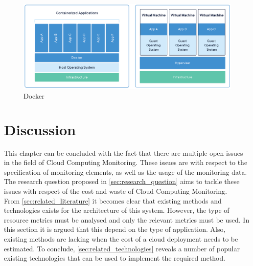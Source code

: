 \begin{figure}
    \centering
    \includegraphics[width=\textwidth]{gfx/docker.png}
    \caption[Docker]{Docker\footnotemark}
    \label{fig:docker}
\end{figure}


\section{Discussion} \label{sec:relatedwork_discussion}

This chapter can be concluded with the fact that there are multiple open issues in the field of Cloud Computing Monitoring. These issues are with respect to the specification of monitoring elements, as well as the usage of the monitoring data. The research question proposed in \autoref{sec:research_question}
aims to tackle these issues with respect of the cost and waste of Cloud Computing Monitoring.\\

\noindent
From \autoref{sec:related_literature} it becomes clear that existing methods and technologies exists for the architecture of this system. However, the type of resource metrics must be analysed and only the relevant metrics must be used. In this section it is argued that this depend on the type of application. Also, existing methods are lacking when the cost of a cloud deployment needs to be estimated. To conclude, \autoref{sec:related_technologies} reveals a number of popular existing technologies that can be used to implement the required method.